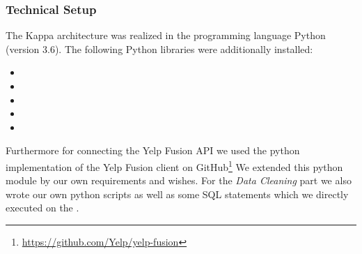 \subsubsection{Technical Setup}
\label{subsubsec:setup}
The Kappa architecture was realized in the programming language Python (version 3.6).
The following Python libraries were additionally installed:
\begin{itemize}
  \item {}
  \item {}
  \item {}
  \item {}
  \item {}
\end{itemize}
Furthermore for connecting the Yelp Fusion \ac{API} we used the python implementation of the Yelp Fusion client on GitHub\footnote{\url{https://github.com/Yelp/yelp-fusion}}
We extended this python module by our own requirements and wishes.
\newline
For the \textit{Data Cleaning} part we also wrote our own python scripts as well as some \ac{SQL} statements which we directly executed on the \pg{}.
